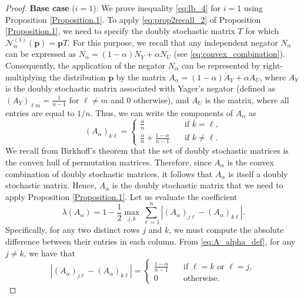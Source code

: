 \documentclass[pdflatex,sn-basic,iicol]{sn-jnl}%
\theoremstyle{thmstyleone}%
\theoremstyle{thmstyletwo}%
\theoremstyle{thmstylethree}%
\newcommand{\N}{\mathcal{N}}
\newcommand{\bp}{\mathbf{p}}
\begin{document}
\begin{proof}
    \smallskip
    {
    \noindent
    \textbf{Base case} ($i=1$): We prove inequality \eqref{eq:lb_4} for $i=1$ using Proposition \ref{Proposition.1}.
    To apply \eqref{eq:prop2recall_2} of Proposition \ref{Proposition.1}, we  need to
    specify the doubly stochastic matrix $T$ for which  $\N_\alpha^{(1)}(\bp)=\bp T$. For this purpose, we recall that any independent negator $N_\alpha$ can be expressed as
    $N_\alpha = (1-\alpha)N_Y + \alpha N_U$ (see \eqref{eq:convex_combination}). Consequently, the application of the negator $N_\alpha$ can be represented by right-multiplying the distribution
    $\bp$ by the matrix $A_\alpha = (1-\alpha)A_Y + \alpha A_U$, where $A_Y$ is the doubly stochastic matrix associated with Yager's negator (defined as $(A_Y)_{\ell m}=\frac{1}{n-1}$ for $\ell\neq m$ and $0$ otherwise), and $A_U$ is the matrix, where all entries are equal to $1/n$. Thus, we can write the components of $A_\alpha$ as
    \begin{equation}\label{eq:A_alpha_def}
        (A_\alpha)_{k\ell} = \begin{cases}
            \frac{\alpha}{n}&\quad\mbox{if } k=\ell,\\
            \frac{\alpha}{n} + \frac{1-\alpha}{n-1}&\quad\mbox{if } k\neq\ell.
        \end{cases}
    \end{equation}
    We recall from Birkhoff's theorem \citep[Thm. A.2]{marshall1979inequalities} that the set of doubly stochastic matrices is the convex hull of permutation matrices. Therefore, since $A_\alpha$ is the convex combination of doubly stochastic matrices, it follows that $A_\alpha$ is itself a doubly stochastic matrix. Hence, $A_\alpha$ is the doubly stochastic matrix that we need to apply Proposition \ref{Proposition.1}. Let us evaluate the coefficient
    \begin{equation}\label{eq:coeff_def_A}
        \lambda(A_\alpha)=1-\frac{1}{2}\max_{j,k}\sum_{\ell=1}^n|(A_\alpha)_{j\ell}-(A_\alpha)_{k\ell}|.
    \end{equation}
    Specifically, for any two distinct rows $j$ and $k$, we must compute the absolute difference between their entries in each column. 
    From \eqref{eq:A_alpha_def}, for any $j\neq k$, we have that
    \begin{equation}
        |(A_\alpha)_{j\ell}-(A_\alpha)_{k\ell}|=\begin{cases}
            \frac{1-\alpha}{n-1} &\quad\mbox{if } \ell=k \mbox{ or } \ell=j,\\
            0 &\quad\mbox{otherwise}.\nonumber

\end{cases}
\end{equation}}
\end{proof}
\end{document}
